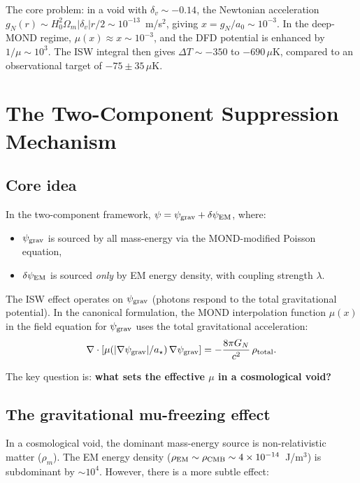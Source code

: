 \documentclass[11pt]{article}
\newcommand{\ee}[1]{\times 10^{#1}}
\newcommand{\psigrav}{\psi_{\rm grav}}
\newcommand{\dpsiEM}{\delta\psi_{\rm EM}}
\newcommand{\GN}{G_N}
\newcommand{\mufd}{\mu}
\newcommand{\aM}{a_0}
\begin{document}
The core problem: in a void with $\delta_v \sim -0.14$, the
Newtonian acceleration $g_N(r) \sim H_0^2 \Omega_m |\delta_v| r
/ 2 \sim 10^{-13}$~m/s$^2$, giving $x = g_N/\aM \sim 10^{-3}$.
In the deep-MOND regime, $\mufd(x) \approx x \sim 10^{-3}$, and the
DFD potential is enhanced by $1/\mufd \sim 10^3$. The ISW integral
then gives $\Delta T \sim -350$ to $-690\,\mu$K, compared to an
observational target of $-75 \pm 35\,\mu$K.

\section{The Two-Component Suppression Mechanism}

\subsection{Core idea}

In the two-component framework, $\psi = \psigrav + \dpsiEM$, where:
\begin{itemize}[nosep]
\item $\psigrav$ is sourced by all mass-energy via the MOND-modified
  Poisson equation,
\item $\dpsiEM$ is sourced \emph{only} by EM energy density, with
  coupling strength $\lambda$.
\end{itemize}

The ISW effect operates on $\psigrav$ (photons respond to the total
gravitational potential). In the canonical formulation, the MOND
interpolation function $\mufd(x)$ in the field equation for $\psigrav$
uses the total gravitational acceleration:
\begin{equation}
\nabla\cdot[\mufd(|\nabla\psigrav|/a_\star)\,\nabla\psigrav]
= -\frac{8\pi\GN}{c^2}\,\rho_{\rm total}.
\label{eq:psi-grav-equation}
\end{equation}

The key question is: \textbf{what sets the effective $\mufd$ in a
cosmological void?}

\subsection{The gravitational mu-freezing effect}

In a cosmological void, the dominant mass-energy source is
non-relativistic matter ($\rho_m$). The EM energy density
($\rho_{\rm EM} \sim \rho_{\rm CMB} \sim 4\ee{-14}$~J/m$^3$) is
subdominant by $\sim 10^4$. However, there is a more subtle effect:
\end{document}
